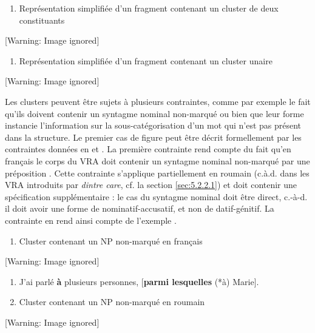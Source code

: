 \begin{enumerate}
\item \label{bkm:Ref298950556}Représentation simplifiée d'un fragment contenant un cluster de deux constituants


\end{enumerate}
{   [Warning: Image ignored] %
} 


\begin{enumerate}
\item \label{bkm:Ref298950558}Représentation simplifiée d'un fragment contenant un cluster unaire


\end{enumerate}
{   [Warning: Image ignored] %
} 

Les clusters peuvent être sujets à plusieurs contraintes, comme par exemple le fait qu'ils doivent contenir un syntagme nominal non-marqué ou bien que leur forme instancie l'information sur la sous-catégorisation d'un mot qui n'est pas présent dans la structure. Le premier cas de figure peut être décrit formellement par les contraintes données en  et . La première contrainte rend compte du fait qu'en français le corps du VRA doit contenir un syntagme nominal non-marqué par une préposition . Cette contrainte s'applique partiellement en roumain (c.à.d. dans les VRA introduits par \textit{dintre care}, cf. la section \ref{sec:5.2.2.1}) et doit contenir une spécification supplémentaire : le cas du syntagme nominal doit être direct, c.-à-d. il doit avoir une forme de nominatif-accusatif, et non de datif-génitif. La contrainte en  rend ainsi compte de l'exemple . 


\begin{enumerate}
\item \label{bkm:Ref298951898}Cluster contenant un NP non-marqué en français


\end{enumerate}
  [Warning: Image ignored] %
 


\begin{enumerate}
\item \label{bkm:Ref298952628}J'ai parlé \textbf{à} plusieurs personnes, [\textbf{parmi lesquelles} (*à) Marie].

\item \label{bkm:Ref298953361}\label{bkm:Ref298951902}Cluster contenant un NP non-marqué en roumain


\end{enumerate}
  [Warning: Image ignored] %
 


